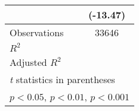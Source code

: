 \begin{table}[htbp]
\begin{tabular*}{0.8\hsize}{@{\hskip\tabcolsep\extracolsep\fill}l*{1}{c}}
                    &    (-13.47)         \\
\midrule
Observations        &       33646         \\
\(R^{2}\)           &                     \\
Adjusted \(R^{2}\)  &                     \\
\bottomrule
\multicolumn{2}{l}{\footnotesize \textit{t} statistics in parentheses}\\
\multicolumn{2}{l}{\footnotesize \sym{*} \(p<0.05\), \sym{**} \(p<0.01\), \sym{***} \(p<0.001\)}\\
\end{tabular*}
\end{table}
